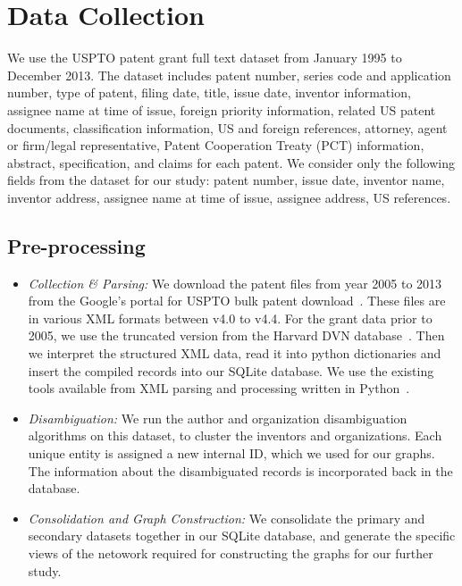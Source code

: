\section{Data Collection}

We use the USPTO patent grant full text dataset from January 1995 to December 
2013.  The dataset includes patent number, series code and application number,
type of patent, filing date, title, issue date, inventor information, assignee
name at time of issue, foreign priority information, related US patent
documents, classification information, US and foreign references, attorney,
agent or firm/legal representative, Patent Cooperation Treaty (PCT)
information, abstract, specification, and claims for each patent. We consider
only the following fields from the dataset for our study: patent number, issue
date, inventor name, inventor address, assignee name at time of issue, assignee address, US
references. 


\subsection{Pre-processing}

\begin{itemize}
\item {\em Collection \& Parsing:} We download the patent files from year 2005 to 2013 from the Google's portal for USPTO bulk patent download~\cite{usptodb}. These files are in various XML formats between v4.0 to v4.4. For the grant data prior to 2005, we use the truncated version from the Harvard DVN database~\cite{dvn}. Then we interpret the structured XML data, read it into python dictionaries and insert the compiled records into our SQLite database. We use the existing tools available from XML parsing and processing written in 
Python~\cite{newparser, formattingpatentdata}. 

\item {\em Disambiguation:} We run the author and organization disambiguation algorithms on this dataset, to cluster the inventors and organizations. Each unique entity is assigned a new internal ID, which we used for our graphs. The information about the disambiguated records is incorporated back in the database. 

\item {\em Consolidation and Graph Construction:} 
We consolidate the primary and secondary datasets together in our SQLite database, and generate the specific views of the netowork required for constructing the graphs for our further study.
\end{itemize}

